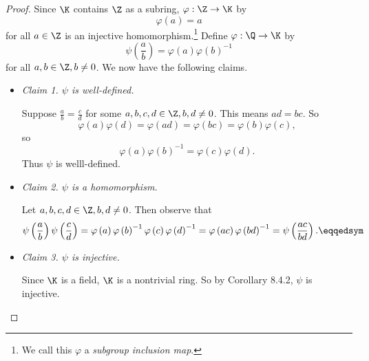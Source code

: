 \documentclass[pmath347]{subfiles}
\begin{document}
    \begin{proof}
        Since $\K$ contains $\Z$ as a subring, $\varphi:\Z\to\K$ by
        \begin{equation*}
            \varphi\left( a \right) = a
        \end{equation*}
        for all $a\in\Z$ is an injective homomorphism.\footnote{We call this $\varphi$ a \emph{subgroup inclusion map}.} Define $\varphi:\Q\to\K$ by
        \begin{equation*}
            \psi\left( \frac{a}{b} \right) = \varphi\left( a \right) \varphi\left( b \right) ^{-1} 
        \end{equation*}
        for all $a,b\in\Z, b\neq 0$. We now have the following claims.
        \begin{itemize}
            \item \textit{Claim 1. $\psi$ is well-defined.}

                \begin{subproof}
                    Suppose $\frac{a}{b}=\frac{c}{d}$ for some $a,b,c,d\in\Z, b,d\neq 0$. This means $ad=bc$. So
                    \begin{equation*}
                        \varphi\left( a \right) \varphi\left( d \right) = \varphi\left( ad \right) = \varphi\left( bc \right) = \varphi\left( b \right) \varphi\left( c \right) ,
                    \end{equation*}
                    so
                    \begin{equation*}
                        \varphi\left( a \right) \varphi\left( b \right) ^{-1} = \varphi\left( c \right) \varphi\left( d \right) .
                    \end{equation*}
                    Thus $\psi$ is welll-defined.
                \end{subproof}

            \item \textit{Claim 2. $\psi$ is a homomorphism.}

                \begin{subproof}
                    Let $a,b,c,d\in\Z, b,d\neq 0$. Then observe that
                    \begin{equation*}
                        \psi\left( \frac{a}{b} \right) \psi\left( \frac{c}{d} \right) = \varphi\left( a \right) \varphi\left( b \right) ^{-1} \varphi\left( c \right) \varphi\left( d \right) ^{-1} = \varphi\left( ac \right) \varphi\left( bd \right) ^{-1} = \psi\left( \frac{ac}{bd} \right) . \eqqedsym
                    \end{equation*}
                \end{subproof}

            \item \textit{Claim 3. $\psi$ is injective.}

                \begin{subproof}
                    Since $\K$ is a field, $\K$ is a nontrivial ring. So by Corollary 8.4.2, $\psi$ is injective. \qqedsym
                \end{subproof}
        \end{itemize} 
    \end{proof}
\end{document}
